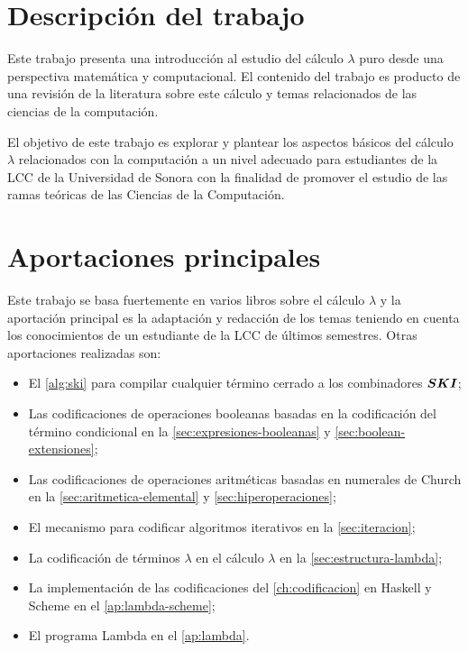 \section*{Descripción del trabajo}

Este trabajo presenta una introducción al estudio del cálculo $ λ $ puro desde una perspectiva matemática y computacional. El contenido del trabajo es producto de una revisión de la literatura sobre este cálculo y temas relacionados de las ciencias de la computación.

El objetivo de este trabajo es explorar y plantear los aspectos básicos del cálculo $ λ $ relacionados con la computación a un nivel adecuado para estudiantes de la LCC de la Universidad de Sonora con la finalidad de promover el estudio de las ramas teóricas de las Ciencias de la Computación.

\section*{Aportaciones principales}

Este trabajo se basa fuertemente en varios libros sobre el cálculo $ λ $ y la aportación principal es la adaptación y redacción de los temas teniendo en cuenta los conocimientos de un estudiante de la LCC de últimos semestres. Otras aportaciones realizadas son:
\begin{itemize}
\item El \autoref{alg:ski} para compilar cualquier término cerrado a los combinadores $ \boldsymbol{SKI} $;
\item Las codificaciones de operaciones booleanas basadas en la codificación del término condicional en la \autoref{sec:expresiones-booleanas} y \autoref{sec:boolean-extensiones};
\item Las codificaciones de operaciones aritméticas basadas en numerales de Church en la \autoref{sec:aritmetica-elemental} y \autoref{sec:hiperoperaciones};
\item El mecanismo para codificar algoritmos iterativos en la \autoref{sec:iteracion};
\item La codificación de términos $ λ $ en el cálculo $ λ $ en la \autoref{sec:estructura-lambda};
\item La implementación de las codificaciones del \autoref{ch:codificacion} en Haskell y Scheme en el \autoref{ap:lambda-scheme};
\item El programa Lambda en el \autoref{ap:lambda}.
\end{itemize}

